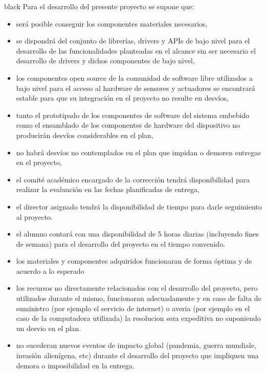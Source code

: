 \documentclass[
11pt, %
]{charter}
\begin{document}
\begin{consigna}{black}
Para el desarrollo del presente proyecto se supone que: 

\begin{itemize}
	\item será posible conseguir los componentes materiales necesarios,
	\item se dispondrá del conjunto de librerías, drivers y APIs de bajo nivel para el desarrollo de las funcionalidades planteadas en el alcance sin ser necesario el desarrollo de drivers y dichos componentes de bajo nivel,
	\item los componentes open source de la comunidad de software libre utilizados a bajo nivel para el acceso al hardware de sensores y actuadores se encontrará estable para que su integración en el proyecto no resulte en desvíos,	
	\item tanto el prototipado de los componentes de software del sistema embebido como el ensamblado de los componentes de hardware del dispositivo no producirán desvíos considerables en el plan,
	\item no habrá desvíos no contemplados en el plan que impidan o demoren entregas en el proyecto,
	\item el comité académico encargado de la corrección tendrá disponibilidad para realizar la evaluación en las fechas planificadas de entrega,
	\item el director asignado tendrá la disponibilidad de tiempo para darle seguimiento al proyecto.
	\item el alumno contará con una disponibilidad de 5 horas diarias (incluyendo fines de semana) para el desarrollo del proyecto en el tiempo convenido.
	\item los materiales y componentes adquiridos funcionaran de forma óptima y de acuerdo a lo esperado
	\item los recursos no directamente relacionados con el desarrollo del proyecto, pero utilizados durante el mismo, funcionaran adecuadamente y en caso de falta de suministro (por ejemplo el servicio de internet) o averia (por ejemplo en el caso de la computadora utilizada) la resolucion sera expeditiva no suponiendo un desvio en el plan.
	\item no sucederan nuevos eventos de impacto global (pandemia, guerra mundiale, invasión alienígena, etc) durante el desarrollo del proyecto que impliquen una demora o imposibilidad en la entrega.
\end{itemize}


\end{consigna}
\end{document}

